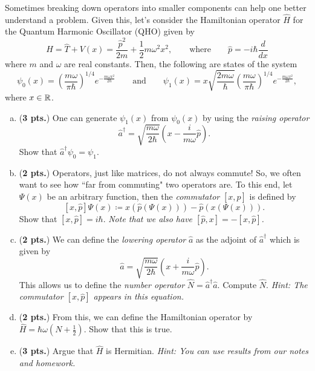 \documentclass[12pt]{amsbook}
\begin{document}
\newpage
\begin{problem}
Sometimes breaking down operators into smaller components can help one better understand a problem. Given this, let's consider the Hamiltonian operator $\hat{H}$ for the Quantum Harmonic Oscillator (QHO) given by
\[
\hat{H} = \hat{T}+V(x) = \frac{\hat{p}^2}{2m} + \frac{1}{2}m\omega^2 x^2,  \qquad \textrm{where} \qquad \hat{p} = -i\hbar \frac{d}{dx}
\]
where $m$ and $\omega$ are real constants.  Then, the following are states of the system
\[
\psi_0(x) = \left(\frac{m\omega}{\pi \hbar}\right)^{1/4} e^{-\frac{m\omega x^2}{2\hbar}} \qquad \textrm{and} \qquad \psi_1(x) = x \sqrt{\frac{2m\omega}{\hbar}}\left(\frac{m\omega}{\pi \hbar}\right)^{1/4} e^{-\frac{m\omega x^2}{2\hbar}},
\]
where $x \in \mathbb{R}$. 
\begin{enumerate}[(a)]
	\item (\textbf{3 pts.}) One can generate $\psi_1(x)$ from $\psi_0(x)$ by using the \emph{raising operator}
	\[
	\hat{a}^\dagger = \sqrt{\frac{m\omega }{2\hbar}}\left(x-\frac{i}{m\omega} \hat{p}\right).
	\]  
	Show that $\hat{a}^\dagger\psi_0 = \psi_1$.
	
	\item (\textbf{2 pts.}) Operators, just like matrices, do not always commute! So, we often want to see how ``far from commuting" two operators are. To this end, let $\Psi(x)$ be an arbitrary function, then the \emph{commutator} $[x,\hat{p}]$ is defined by
	\[
	[x,\hat{p}] \Psi(x) \coloneqq x \left(\hat{p}\left( \Psi(x)\right)\right) - \hat{p}\left(x\left(\Psi(x)\right)\right).
	\]
	Show that $[x,\hat{p}]=i\hbar$. \textit{Note that we also have $[\hat{p},x]=-[x,\hat{p}]$.}
	
	\item (\textbf{2 pts.}) We can define the \emph{lowering operator} $\hat{a}$ as the adjoint of $\hat{a}^\dagger$ which is given by
	\[
	\hat{a} = \sqrt{\frac{m\omega }{2\hbar}}\left(x+\frac{i}{m\omega} \hat{p} \right).
	\]
	This allows us to define the \emph{number operator} $\hat{N}=\hat{a}^\dagger \hat{a}$.  Compute $\hat{N}$. \textit{Hint: The commutator $[x,\hat{p}]$ appears in this equation.}
	
	\item (\textbf{2 pts.}) From this, we can define the Hamiltonian operator by $\hat{H}=\hbar \omega \left(N + \frac{1}{2}\right)$. Show that this is true.
	
	\item (\textbf{3 pts.}) Argue that $\hat{H}$ is Hermitian.  \textit{Hint: You can use results from our notes and homework.}
	

\end{enumerate}
\end{problem}
\end{document}
